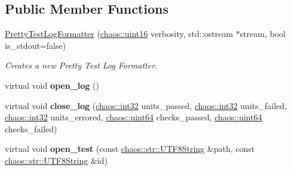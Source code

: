 \subsection*{Public Member Functions}
\begin{DoxyCompactItemize}
\item 
\hypertarget{classchaos_1_1test_1_1log__formatter_1_1_pretty_test_log_formatter_ac844397bcd31b15b72acfa75423994fb}{}\hyperlink{classchaos_1_1test_1_1log__formatter_1_1_pretty_test_log_formatter_ac844397bcd31b15b72acfa75423994fb}{Pretty\+Test\+Log\+Formatter} (\hyperlink{namespacechaos_ac3888b1c9e56da7fbbdb3ab8425b4068}{chaos\+::uint16} verbosity, std\+::ostream $\ast$stream, bool is\+\_\+stdout=false)\label{classchaos_1_1test_1_1log__formatter_1_1_pretty_test_log_formatter_ac844397bcd31b15b72acfa75423994fb}

\begin{DoxyCompactList}\small\item\em Creates a new Pretty Test Log Formatter. \end{DoxyCompactList}\item 
\hypertarget{classchaos_1_1test_1_1log__formatter_1_1_pretty_test_log_formatter_acfc156f1c2b4c0b688573f648c6b7349}{}virtual void {\bfseries open\+\_\+log} ()\label{classchaos_1_1test_1_1log__formatter_1_1_pretty_test_log_formatter_acfc156f1c2b4c0b688573f648c6b7349}

\item 
\hypertarget{classchaos_1_1test_1_1log__formatter_1_1_pretty_test_log_formatter_a6c11db4af38ba46b6f799cac8ce4a8e9}{}virtual void {\bfseries close\+\_\+log} (\hyperlink{namespacechaos_ad1de7efb430365afd2c9446a0f522a90}{chaos\+::int32} units\+\_\+passed, \hyperlink{namespacechaos_ad1de7efb430365afd2c9446a0f522a90}{chaos\+::int32} units\+\_\+failed, \hyperlink{namespacechaos_ad1de7efb430365afd2c9446a0f522a90}{chaos\+::int32} units\+\_\+errored, \hyperlink{namespacechaos_a34fe5f5bfc3ef6d80b5d094ed91b4d6e}{chaos\+::uint64} checks\+\_\+passed, \hyperlink{namespacechaos_a34fe5f5bfc3ef6d80b5d094ed91b4d6e}{chaos\+::uint64} checks\+\_\+failed)\label{classchaos_1_1test_1_1log__formatter_1_1_pretty_test_log_formatter_a6c11db4af38ba46b6f799cac8ce4a8e9}

\item 
\hypertarget{classchaos_1_1test_1_1log__formatter_1_1_pretty_test_log_formatter_ae77aea3084d292464322207573b18a53}{}virtual void {\bfseries open\+\_\+test} (const \hyperlink{classchaos_1_1str_1_1_u_t_f8_string}{chaos\+::str\+::\+U\+T\+F8\+String} \&path, const \hyperlink{classchaos_1_1str_1_1_u_t_f8_string}{chaos\+::str\+::\+U\+T\+F8\+String} \&id)\label{classchaos_1_1test_1_1log__formatter_1_1_pretty_test_log_formatter_ae77aea3084d292464322207573b18a53}


\end{DoxyCompactItemize}
